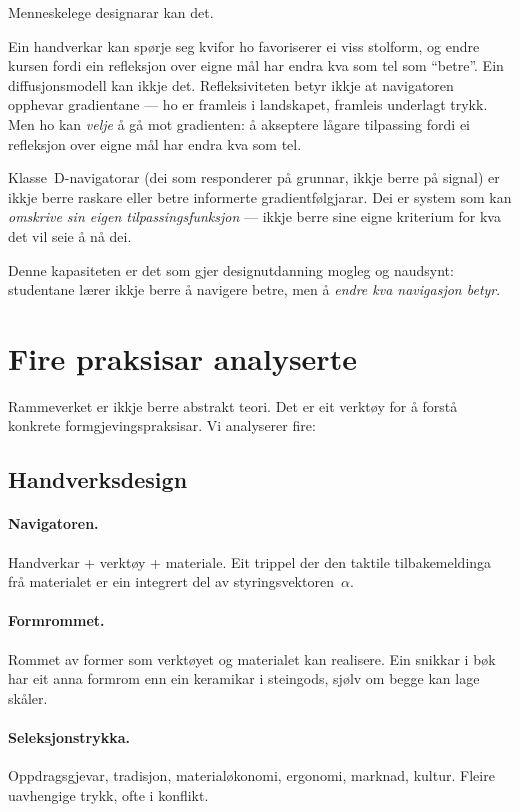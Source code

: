 Menneskelege designarar kan det.

Ein handverkar kan spørje seg kvifor ho favoriserer ei viss
stolform, og endre kursen fordi ein refleksjon over eigne mål har
endra kva som tel som ``betre''. Ein diffusjonsmodell kan ikkje
det. Refleksiviteten betyr ikkje at navigatoren opphevar
gradientane --- ho er framleis i landskapet, framleis underlagt
trykk. Men ho kan \emph{velje} å gå mot gradienten: å akseptere
lågare tilpassing fordi ei refleksjon over eigne mål har endra
kva som tel.

Klasse~D-navigatorar (dei som responderer på grunnar, ikkje berre
på signal) er ikkje berre raskare eller betre informerte
gradientfølgjarar. Dei er system som kan \emph{omskrive sin eigen
tilpassingsfunksjon} --- ikkje berre sine eigne kriterium for
kva det vil seie å nå dei.

Denne kapasiteten er det som gjer designutdanning mogleg og
naudsynt: studentane lærer ikkje berre å navigere betre, men å
\emph{endre kva navigasjon betyr}.


\section{Fire praksisar analyserte}

Rammeverket er ikkje berre abstrakt teori. Det er eit verktøy for
å forstå konkrete formgjevingspraksisar. Vi analyserer fire:

\subsection{Handverksdesign}

\paragraph{Navigatoren.}
Handverkar + verktøy + materiale. Eit trippel der den taktile
tilbakemeldinga frå materialet er ein integrert del av
styringsvektoren~$\alpha$.

\paragraph{Formrommet.}
Rommet av former som verktøyet og materialet kan realisere. Ein
snikkar i bøk har eit anna formrom enn ein keramikar i steingods,
sjølv om begge kan lage skåler.

\paragraph{Seleksjonstrykka.}
Oppdragsgjevar, tradisjon, materialøkonomi, ergonomi, marknad,
kultur. Fleire uavhengige trykk, ofte i konflikt.

